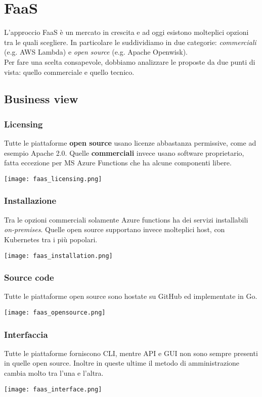 \newpage
\section{FaaS}
L'approccio FaaS è un mercato in crescita e ad oggi esistono molteplici opzioni tra le quali scegliere. In particolare le suddividiamo in due categorie: \emph{commerciali} (e.g. AWS Lambda) e \emph{open source} (e.g. Apache Openwisk).\\
Per fare una scelta consapevole, dobbiamo analizzare le proposte da due punti di vista: quello commerciale e quello tecnico.
\subsection{Business view}
\subsubsection{Licensing}
Tutte le piattaforme \textbf{open source} usano licenze abbastanza permissive, come ad esempio Apache 2.0. Quelle \textbf{commerciali} invece usano software proprietario, fatta eccezione per MS Azure Functions che ha alcune componenti libere.
\begin{center}
	\texttt{[image: faas\_licensing.png]}
\end{center}
\subsubsection{Installazione}
Tra le opzioni commerciali solamente Azure functions ha dei servizi installabili \emph{on-premises}. Quelle open source supportano invece molteplici host, con Kubernetes tra i più popolari.
\begin{center}
	\texttt{[image: faas\_installation.png]}
\end{center}
\newpage
\subsubsection{Source code}
Tutte le piattaforme open source sono hostate su GitHub ed implementate in Go.
\begin{center}
	\texttt{[image: faas\_opensource.png]}
\end{center}
\subsubsection{Interfaccia}
Tutte le piattaforme forniscono CLI, mentre API e GUI  non sono sempre presenti in quelle open source. Inoltre in queste ultime il metodo di amministrazione cambia molto tra l'una e l'altra.
\begin{center}
	\texttt{[image: faas\_interface.png]}
\end{center}
